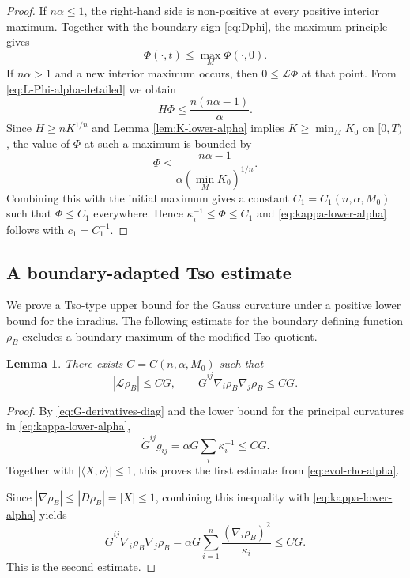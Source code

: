 \documentclass[11pt, reqno]{amsart}
\newtheorem{lemma}[theorem]{Lemma}
\theoremstyle{remark}
\theoremstyle{definition}
\numberwithin{equation}{section}
\newcommand{\cL}{\mathcal L}
\begin{document}
\begin{proof}
If $n\alpha\le1$, the right-hand side is non-positive at every positive interior maximum. Together with the boundary sign \eqref{eq:Dphi}, the maximum principle gives
\begin{equation*}
        \Phi(\cdot,t)\le \max_M\Phi(\cdot,0).
\end{equation*}
If $n\alpha>1$ and a new interior maximum occurs, then $0\le\cL\Phi$ at that point.  From \eqref{eq:L-Phi-alpha-detailed} we obtain
\begin{equation*}
        H\Phi\le \frac{n(n\alpha-1)}{\alpha}.
\end{equation*}
Since $H\ge nK^{1/n}$ and Lemma \ref{lem:K-lower-alpha} implies $K\ge \min_MK_0$ on $[0,T)$, the value of $\Phi$ at such a maximum is bounded by
\begin{equation*}
        \Phi\le \frac{n\alpha-1}{\alpha(\min_MK_0)^{1/n}}.
\end{equation*}
Combining this with the initial maximum gives a constant $C_1=C_1(n,\alpha,M_0)$ such that $\Phi\le C_1$ everywhere.  Hence $\kappa_i^{-1}\le \Phi\le C_1$ and \eqref{eq:kappa-lower-alpha} follows with $c_1=C_1^{-1}$.

\end{proof}

\subsection{A boundary-adapted Tso estimate}
\label{subsec:Tso-alpha}
We prove a Tso-type upper bound for the Gauss curvature under a positive lower bound for the inradius.  The following estimate for the boundary defining function $\rho_B$ excludes a boundary maximum of the modified Tso quotient.

\begin{lemma}\label{lem:rho-est-alpha}
There exists
$C=C(n,\alpha,M_0)$ such that
\begin{equation*}
        |\mathcal{L}\rho_B|\le CG,
        \qquad
        \dot G^{ij}\nabla_i\rho_B\nabla_j\rho_B\le CG.
\end{equation*}
\end{lemma}

\begin{proof}
By \eqref{eq:G-derivatives-diag} and the lower bound for the principal curvatures in \eqref{eq:kappa-lower-alpha},
\begin{equation*}
        \dot G^{ij}g_{ij}
        =\alpha G\sum_i\kappa_i^{-1}\le CG.
\end{equation*}
Together with $|\langle X,\nu\rangle|\le1$, this proves the first estimate from \eqref{eq:evol-rho-alpha}.

Since
$|\nabla\rho_B|\le|D\rho_B|=|X|\le1$, combining this inequality with \eqref{eq:kappa-lower-alpha} yields
\begin{equation*}
    \dot{G}^{ij}\nabla_i \rho_B \nabla_j \rho_B = \alpha G \sum\limits_{i=1}^n \dfrac{(\nabla_i \rho_B)^2}{\kappa_i}\leq CG.
\end{equation*}
This is the second estimate.
\end{proof}
\end{document}
